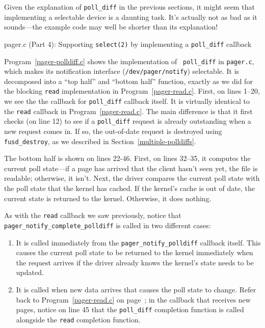 \documentclass{article}
\begin{document}
Given the explanation of {\tt poll\_diff} in the previous sections, it
might seem that implementing a selectable device is a daunting task.
It's actually not as bad as it sounds---the example code may well be
shorter than its explanation!

\begin{Program}
\caption{pager.c (Part 4): Supporting {\tt select(2)} by implementing a
{\tt poll\_diff} callback}
\label{pager-polldiff.c}
\end{Program}

Program~\ref{pager-polldiff.c} shows the implementation of {\tt
poll\_diff} in {\tt pager.c}, which makes its notification interface
({\tt /dev/pager/notify}) selectable.  It is decomposed into a ``top
half'' and ``bottom half'' function, exactly as we did for the
blocking {\tt read} implementation in Program~\ref{pager-read.c}.
First, on lines 1--20, we see the the callback for {\tt poll\_diff}
callback itself.  It is virtually identical to the {\tt read} callback
in Program~\ref{pager-read.c}.  The main difference is that it first
checks (on line 12) to see if a {\tt poll\_diff} request is already
outstanding when a new request comes in.  If so, the out-of-date
request is destroyed using {\tt fusd\_destroy}, as we described in
Section~\ref{multiple-polldiffs}.

The bottom half is shown on lines 22-46.  First, on lines 32--35, it
computes the current poll state---if a page has arrived that the
client hasn't seen yet, the file is readable; otherwise, it isn't.
Next, the driver compares the current poll state with the poll state
that the kernel has cached.  If the kernel's cache is out of date, the
current state is returned to the kernel.  Otherwise, it does nothing.

As with the {\tt read} callback we saw previously, notice that {\tt
pager\_notify\_complete\_polldiff} is called in two different cases:
\begin{enumerate}
\item It is called immediately from the {\tt pager\_notify\_polldiff}
callback itself.  This causes the current poll state to be returned to
the kernel immediately when the request arrives if the driver already
knows the kernel's state needs to be updated.
\item It is called when new data arrives that causes the poll state to
change.  Refer back to Program~\ref{pager-read.c} on
page~\pageref{pager-read.c}; in the callback that receives new pages,
notice on line 45 that the {\tt poll\_diff} completion function is called
alongside the {\tt read} completion function.
\end{enumerate}
\end{document}

